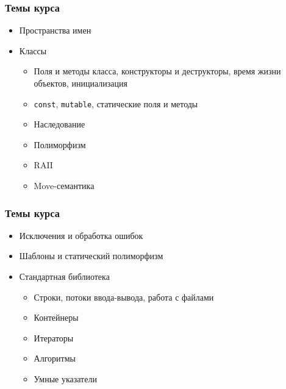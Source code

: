 \documentclass[compress, aspectratio=169]{beamer}
\begin{document}
\begin{frame}

    \frametitle{Темы курса}

    \begin{itemize}

        \item Пространства имен

        \item Классы

            \begin{itemize}

                \item Поля и методы класса, конструкторы и деструкторы,
                    время жизни объектов, инициализация

                \item \texttt{const}, \texttt{mutable}, статические поля и методы

                \item Наследование

                \item Полиморфизм

                \item RAII

                \item Move-семантика

            \end{itemize}

    \end{itemize}

\end{frame}

\begin{frame}

    \frametitle{Темы курса}

    \begin{itemize}

        \item Исключения и обработка ошибок

        \item Шаблоны и статический полиморфизм

        \item Стандартная библиотека

            \begin{itemize}

                \item Строки, потоки ввода-вывода, работа с файлами

                \item Контейнеры

                \item Итераторы

                \item Алгоритмы

                \item Умные указатели

            \end{itemize}

    \end{itemize}

\end{frame}
\end{document}
